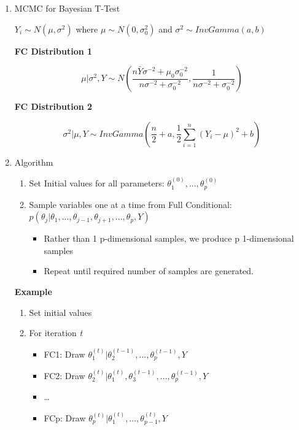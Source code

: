 \documentclass[11pt]{article}
\begin{document}
\begin{enumerate}
\item MCMC for Bayesian T-Test
\label{sec:orgacdb172}

\(Y_i \sim N(\mu, \sigma^2)\) where \(\mu \sim N(0, \sigma_0^2)\) and \(\sigma^2 \sim
InvGamma(a,b)\)

\textbf{FC Distribution 1}

$$\mu | \sigma^2, Y \sim N(\frac{n \bar Y \sigma^{-2} + \mu_0 \sigma_0^{-2}}{n
\sigma^{-2} + \sigma_0^{-2}}, \frac{1}{n \sigma^{-2} + \sigma_0^{-2}})$$

\textbf{FC Distribution 2}

$$
\sigma^2 | \mu, Y \sim InvGamma(\frac{n}{2} + a, \frac{1}{2} \sum_{i = 1}^{n}
(Y_i - \mu)^2 + b)
$$

\item Algorithm
\label{sec:orgede83fc}

\begin{enumerate}
\item Set Initial values for all parameters: \(\theta_1^{(0)}, ..., \theta_p^{(0)}\)
\item Sample variables one at a time from Full Conditional: \(p(\theta_j | \theta_1,
   ..., \theta_{j - 1}, \theta_{j + 1}, ..., \theta_p, Y)\)
\begin{itemize}
\item Rather than 1 p-dimensional samples, we produce p 1-dimensional samples
\item Repeat until required number of samples are generated.
\end{itemize}
\end{enumerate}

\textbf{Example}

\begin{enumerate}
\item Set initial values
\item For iteration \emph{t}
\begin{itemize}
\item FC1: Draw \(\theta_1^{(t)} | \theta_2^{(t - 1)}, ..., \theta_p^{(t - 1)}, Y\)
\item FC2: Draw \(\theta_2^{(t)} | \theta_1^{(t)}, \theta_3^{(t - 1)}, ..., \theta_p^{(t - 1)}, Y\)
\item \ldots{}
\item FCp: Draw \(\theta_p^{(t)} | \theta_1^{(t)}, ..., \theta_{p - 1}^{(t)}, Y\)
\end{itemize}
\end{enumerate}


\end{enumerate}
\end{document}
